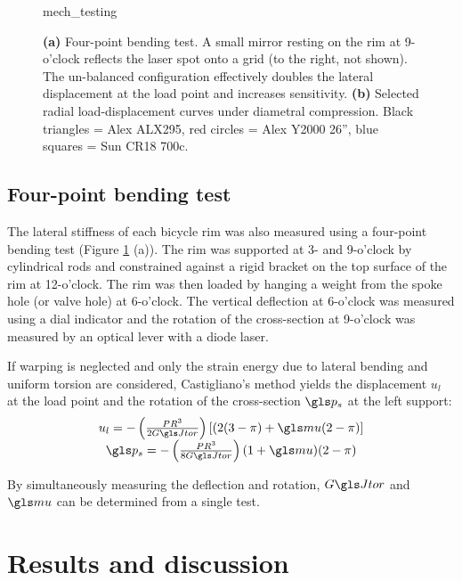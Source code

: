 \documentclass[../thesis.tex]{subfiles}
\begin{document}
\begin{figure}
  \centering
  {mech_testing}
  \caption{\textbf{(a)} Four-point bending test. A small mirror resting on the rim at 9-o’clock reflects the laser spot onto a grid (to the right, not shown). The un-balanced configuration effectively doubles the lateral displacement at the load point and increases sensitivity. \textbf{(b)} Selected radial load-displacement curves under diametral compression. Black triangles = Alex ALX295, red circles = Alex Y2000 26'', blue squares = Sun CR18 700c.}
  \label{fig:mech_tests}
\end{figure}

\subsection{Four-point bending test}

The lateral stiffness of each bicycle rim was also measured using a four-point bending test (Figure \ref{fig:mech_tests} (a)). The rim was supported at 3- and 9-o'clock by cylindrical rods and constrained against a rigid bracket on the top surface of the rim at 12-o'clock. The rim was then loaded by hanging a weight from the spoke hole (or valve hole) at 6-o'clock. The vertical deflection at 6-o'clock was measured using a dial indicator and the rotation of the cross-section at 9-o'clock was measured by an optical lever with a diode laser.

If warping is neglected and only the strain energy due to lateral bending and uniform torsion are considered, Castigliano's method yields the displacement $u_l$ at the load point and the rotation of the cross-section $\p_s$ at the left support:
  \begin{equation}\label{eq:u_4p}
  \begin{array}{c}
  u_l = -\left(\frac{PR^3}{2\GJ}\right) [(2(3-\pi)+\m(2-\pi)]\\
  \p_s = -\left(\frac{PR^3}{8\GJ}\right) (1+\m)(2-\pi)
  \end{array}
  \end{equation}

By simultaneously measuring the deflection and rotation, $\GJ$ and $\m$ can be determined from a single test.

\section{Results and discussion}
\end{document}
